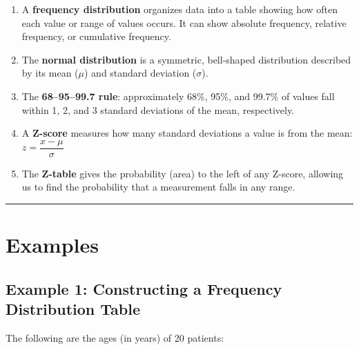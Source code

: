 \documentclass[
  12pt,
  letterpaper,
]{book}
\begin{document}
\begin{tcolorbox}[enhanced jigsaw, arc=.35mm, bottomrule=.15mm, bottomtitle=1mm, breakable, colback=white, colbacktitle=quarto-callout-note-color!10!white, colframe=quarto-callout-note-color-frame, coltitle=black, left=2mm, leftrule=.75mm, opacityback=0, opacitybacktitle=0.6, rightrule=.15mm, title={📝 Chapter 3 Summary}, titlerule=0mm, toprule=.15mm, toptitle=1mm]

\begin{enumerate}
\def\labelenumi{\arabic{enumi}.}
\item
  A \textbf{frequency distribution} organizes data into a table showing
  how often each value or range of values occurs. It can show absolute
  frequency, relative frequency, or cumulative frequency.
\item
  The \textbf{normal distribution} is a symmetric, bell-shaped
  distribution described by its mean (\(\mu\)) and standard deviation
  (\(\sigma\)).
\item
  The \textbf{68--95--99.7 rule}: approximately 68\%, 95\%, and 99.7\%
  of values fall within 1, 2, and 3 standard deviations of the mean,
  respectively.
\item
  A \textbf{Z-score} measures how many standard deviations a value is
  from the mean: \(z = \dfrac{x - \mu}{\sigma}\)
\item
  The \textbf{Z-table} gives the probability (area) to the left of any
  Z-score, allowing us to find the probability that a measurement falls
  in any range.
\end{enumerate}

\end{tcolorbox}

\begin{center}\rule{0.5\linewidth}{0.5pt}\end{center}


\chapter{Examples}\label{examples-2}

\section{Example 1: Constructing a Frequency Distribution
Table}\label{example-1-constructing-a-frequency-distribution-table}

The following are the ages (in years) of 20 patients:
\end{document}
